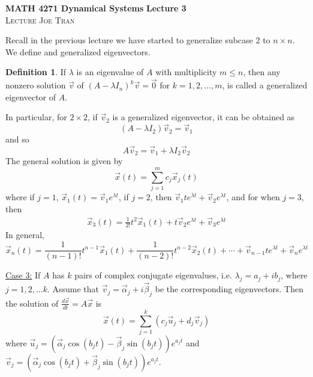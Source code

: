\documentclass[11pt]{article}
\theoremstyle{definition}\newtheorem{definition}{Definition}
\theoremstyle{definition}\newtheorem{notation}{Notation}
\theoremstyle{definition}\newtheorem{example}{Example}
\theoremstyle{theorem}\newtheorem{theorem}{Theorem}
\theoremstyle{theorem}\newtheorem{corollary}{Corollary}
\theoremstyle{theorem}\newtheorem{proposition}{Proposition}
\theoremstyle{theorem}\newtheorem{lemma}{Lemma}
\theoremstyle{theorem}\newtheorem{question}{Question}
\theoremstyle{remark}\newtheorem{remark}{Remark}
\begin{document}
\noindent \textbf{MATH 4271 Dynamical Systems} \hfill \textbf{Lecture 3} \\
\textsc{Lecture} \hfill \textsc{Joe Tran}

Recall in the previous lecture we have started to generalize subcase 2 to $n \times n$. We define and generalized eigenvectors.

\begin{definition}
    If $\lambda$ is an eigenvalue of $A$ with multiplicity $m \leq n$, then any nonzero solution $\vec{v}$ of $(A - \lambda I_n)^k \vec{v} = \vec{0}$ for $k = 1, 2,..., m$, is called a generalized eigenvector of $A$.
\end{definition}

In particular, for $2 \times 2$, if $\vec{v}_2$ is a generalized eigenvector, it can be obtained as
\begin{equation*}
    (A - \lambda I_2) \vec{v}_2 = \vec{v}_1
\end{equation*}
and so
\begin{equation*}
    A\vec{v}_2 = \vec{v}_1 + \lambda I_2\vec{v}_2
\end{equation*}
The general solution is given by
\begin{equation*}
    \vec{x}(t) = \sum_{j = 1}^{m} c_j \vec{x}_j(t)
\end{equation*}
where if $j = 1$, $\vec{x}_1(t) = \vec{v}_1e^{\lambda t}$, if $j = 2$, then $\vec{v}_1te^{\lambda t} + \vec{v}_2e^{\lambda t}$, and for when $j = 3$, then
\begin{align*}
    \vec{x}_3(t) = \frac{1}{2!}t^2\vec{x}_1(t) + t\vec{v}_2e^{\lambda t} + \vec{v}_3e^{\lambda t}
\end{align*}
In general,
\begin{equation*}
    \vec{x}_n(t) = \frac{1}{(n - 1)!}t^{n - 1}\vec{x}_1(t) + \frac{1}{(n - 2)!}t^{n - 2}\vec{x}_2(t) + \cdots + \vec{v}_{n - 1}te^{\lambda t} + \vec{v}_n e^{\lambda t}
\end{equation*}
 
\underline{Case 3:} If $A$ has $k$ pairs of complex conjugate eigenvalues, i.e. $\lambda_j = a_j + ib_j$, where $j = 1, 2,... k$. Assume that $\vec{v}_j = \vec{\alpha}_j + i\vec{\beta}_j$ be the corresponding eigenvectors. Then the solution of $\frac{d\vec{x}}{dt} = A\vec{x}$ is
\begin{equation*}
    \vec{x}(t) = \sum_{j = 1}^{k}\left(c_j\vec{u}_j + d_j\vec{v}_j\right)
\end{equation*}
where $\vec{u}_j = (\vec{\alpha}_j\cos(b_jt) - \vec{\beta}_j\sin(b_jt))e^{a_jt}$ and $\vec{v}_j = (\vec{\alpha}_j\cos(b_jt) + \vec{\beta}_j\sin(b_jt))e^{a_jt}$.
\end{document}
